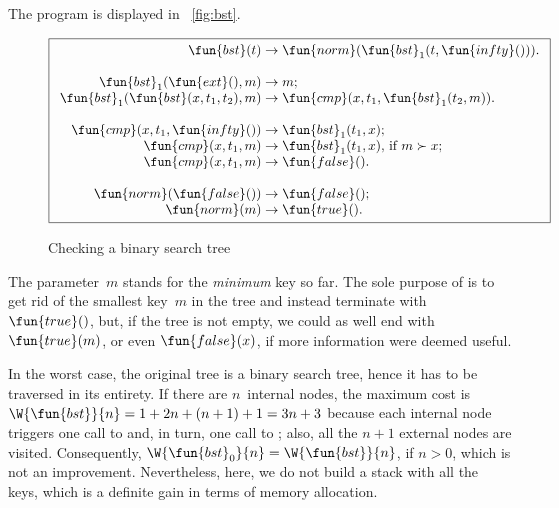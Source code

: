 The program is displayed in
\fig~\vref{fig:bst}.
\begin{figure}[t]
\begin{equation*}
\boxed{
\begin{array}{r@{\;}l@{\;}l}
  \fun{bst}(t) & \rightarrow & \fun{norm}(\fun{bst}_1(t,\fun{infty}())).\\
  \\
  \fun{bst}_1(\fun{ext}(),m) & \rightarrow & m;\\
  \fun{bst}_1(\fun{bst}(x,t_1,t_2),m) & \rightarrow &
  \fun{cmp}(x,t_1,\fun{bst}_1(t_2,m)).\\
\\
\fun{cmp}(x,t_1,\fun{infty}()) & \rightarrow & \fun{bst}_1(t_1,x);\\
\fun{cmp}(x,t_1,m) & \rightarrow &
  \fun{bst}_1(t_1,x), \,\text{if \(m \succ x\)};\\
\fun{cmp}(x,t_1,m) & \rightarrow & \fun{false}().\\
\\
\fun{norm}(\fun{false}()) & \rightarrow & \fun{false}();\\
\fun{norm}(m) & \rightarrow & \fun{true}().
\end{array}}
\end{equation*}
\caption{Checking a binary search tree}
\label{fig:bst}
\end{figure}
The parameter~\(m\) stands for the \emph{minimum} key so far. The sole
purpose of  is to get rid of the
smallest key~\(m\) in the tree and instead terminate with
\(\fun{true}()\), but, if the tree is not empty, we could as well end
with \(\fun{true}(m)\), or even \(\fun{false}(x)\), if more
information were deemed useful.

In the worst case, the original tree is a binary search tree, hence it
has to be traversed in its entirety. If there are \(n\)~internal
nodes, the maximum cost is \(\W{\fun{bst}}{n} = 1 + 2n + (n+1) + 1 =
3n + 3\) because each internal node
triggers one call to  and, in
turn, one call to ; also, all the
\(n+1\) external nodes are visited. Consequently, \(\W{\fun{bst}_0}{n}
= \W{\fun{bst}}{n}\), if \(n > 0\),
which is not an improvement. Nevertheless, here, we do not build a
stack with all the keys, which is a definite gain in terms of memory
allocation.

